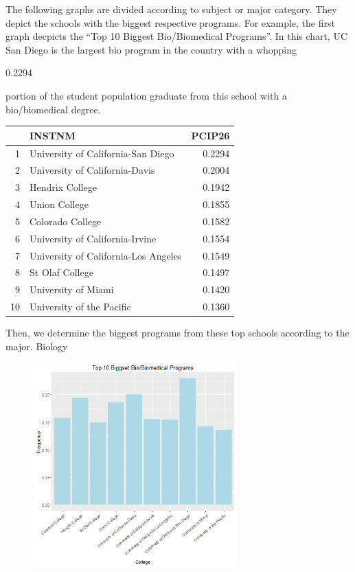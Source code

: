 \documentclass{article}
\begin{document}
\clearpage


The following graphs are divided according to subject or major category.  They depict the schools with the biggest respective programs.  For example, the first graph decpicts the ``Top 10 Biggest Bio/Biomedical Programs''.  In this chart, UC San Diego is the largest bio program in the country with a whopping
\begin{Schunk}
\begin{Soutput}
[1] 0.2294
\end{Soutput}
\end{Schunk}
portion of the student population graduate from this school with a bio/biomedical degree.
\begin{table}[ht]
\centering
\begin{tabular}{rlr}
  \hline
 & INSTNM & PCIP26 \\ 
  \hline
1 & University of California-San Diego & 0.2294 \\ 
  2 & University of California-Davis & 0.2004 \\ 
  3 & Hendrix College & 0.1942 \\ 
  4 & Union College & 0.1855 \\ 
  5 & Colorado College & 0.1582 \\ 
  6 & University of California-Irvine & 0.1554 \\ 
  7 & University of California-Los Angeles & 0.1549 \\ 
  8 & St Olaf College & 0.1497 \\ 
  9 & University of Miami & 0.1420 \\ 
  10 & University of the Pacific & 0.1360 \\ 
   \hline
\end{tabular}
\end{table}Then, we determine the biggest programs from these top schools according to the major. 
Biology 
\begin{figure}[H]
\includegraphics[width=0.7\textwidth]{../images/biggestBio.png}
\end{figure}
\end{document}
